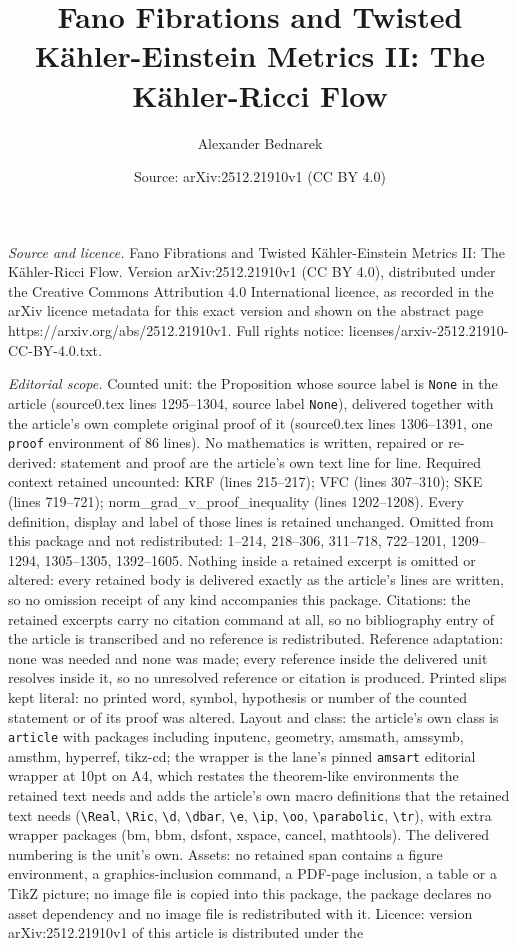 \documentclass[10pt,a4paper]{amsart}
\title[Fano Fibrations and Twisted K\"ahler-Einstein Metrics II: Th]{Fano Fibrations and Twisted K\"ahler-Einstein Metrics II: The K\"ahler-Ricci Flow}
\author{Alexander Bednarek}
\date{Source: arXiv:2512.21910v1 (CC BY 4.0)}
\begin{document}
\maketitle

\noindent\emph{Source and licence.} Fano Fibrations and Twisted K\"ahler-Einstein Metrics II: The K\"ahler-Ricci Flow. Version arXiv:2512.21910v1 (CC BY 4.0), distributed under the Creative Commons Attribution 4.0 International licence, as recorded in the arXiv licence metadata for this exact version and shown on the abstract page https://arxiv.org/abs/2512.21910v1. Full rights notice: licenses/arxiv-2512.21910-CC-BY-4.0.txt.\par\smallskip

\noindent\textit{Editorial scope.} Counted unit: the Proposition whose source label is \texttt{None} in the article (source0.tex lines 1295--1304, source label \texttt{None}), delivered together with the article's own complete original proof of it (source0.tex lines 1306--1391, one \texttt{proof} environment of 86 lines). No mathematics is written, repaired or re-derived: statement and proof are the article's own text line for line. Required context retained uncounted: KRF (lines 215--217); VFC (lines 307--310); SKE (lines 719--721); norm\_grad\_v\_proof\_inequality (lines 1202--1208). Every definition, display and label of those lines is retained unchanged. Omitted from this package and not redistributed: 1--214, 218--306, 311--718, 722--1201, 1209--1294, 1305--1305, 1392--1605. Nothing inside a retained excerpt is omitted or altered: every retained body is delivered exactly as the article's lines are written, so no omission receipt of any kind accompanies this package. Citations: the retained excerpts carry no citation command at all, so no bibliography entry of the article is transcribed and no reference is redistributed. Reference adaptation: none was needed and none was made; every reference inside the delivered unit resolves inside it, so no unresolved reference or citation is produced. Printed slips kept literal: no printed word, symbol, hypothesis or number of the counted statement or of its proof was altered. Layout and class: the article's own class is \texttt{article} with packages including inputenc, geometry, amsmath, amssymb, amsthm, hyperref, tikz-cd; the wrapper is the lane's pinned \texttt{amsart} editorial wrapper at 10pt on A4, which restates the theorem-like environments the retained text needs and adds the article's own macro definitions that the retained text needs (\texttt{\textbackslash Real}, \texttt{\textbackslash Ric}, \texttt{\textbackslash d}, \texttt{\textbackslash dbar}, \texttt{\textbackslash e}, \texttt{\textbackslash ip}, \texttt{\textbackslash oo}, \texttt{\textbackslash parabolic}, \texttt{\textbackslash tr}), with extra wrapper packages (bm, bbm, dsfont, xspace, cancel, mathtools). The delivered numbering is the unit's own. Assets: no retained span contains a figure environment, a graphics-inclusion command, a PDF-page inclusion, a table or a TikZ picture; no image file is copied into this package, the package declares no asset dependency and no image file is redistributed with it. Licence: version arXiv:2512.21910v1 of this article is distributed under the 
\end{document}
